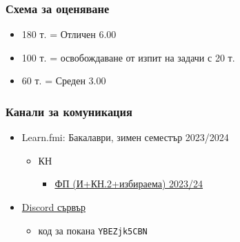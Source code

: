 \documentclass[alsotrans]{beamerswitch}
\begin{document}
\begin{frame}
  \frametitle{Схема за оценяване}

  \begin{itemize}
  \item 180 т. = Отличен 6.00
  \item 100 т. = освобождаване от изпит на задачи с 20 т.
  \item 60 т. = Среден 3.00
  \end{itemize}
\end{frame}

\begin{frame}
  \frametitle{Канали за комуникация}
  \begin{itemize}
  \item Learn.fmi: Бакалаври, зимен семестър 2023/2024
    \begin{itemize}
    \item КН
      \begin{itemize}
      \item \href{https://learn.fmi.uni-sofia.bg/course/view.php?id=9526}{ФП (И+КН.2+избираема) 2023/24}
      \end{itemize}
    \end{itemize}
  \item \href{https://discord.gg/YBEZjk5CBN}{Discord сървър}
    \begin{itemize}
    \item код за покана \tt{YBEZjk5CBN}
    \end{itemize}
  \end{itemize}
\end{frame}
\end{document}
